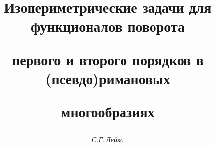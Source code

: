 

 




 


\newcommand{\Gr}{\operatorname{Gr}} 


\newcommand{\const}{\operatorname{const}} 


\newcommand{\extr}{\operatorname{extremum}} 


\newcommand{\la}{\langle} 


\newcommand{\ra}{\rangle} 


\newcommand{\mymath}[1]{\mathop{#1}\limits} 


\newcommand{\tts}[1]{} 


 


 




\setcounter{page}{49} 












 


\author{\it С.Г.\,Лейко} 




\title{Изопериметрические задачи для функционалов  поворота  


первого и второго порядков в (псевдо)римановых  


многообразиях} 


 


\date{} 




\pagestyle{plain} %


